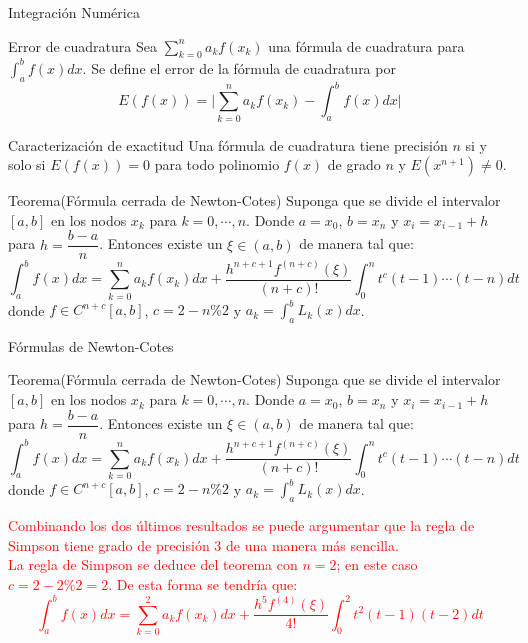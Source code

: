 \begin{frame}[allowframebreaks]{Integración Numérica}
\scriptsize
\begin{block}{Error de cuadratura}
Sea $\displaystyle \sum_{k=0}^{n}a_kf(x_k)$ una fórmula de cuadratura para $\displaystyle \int_{a}^{b}f(x)dx$. Se define el error de la fórmula de cuadratura por $$\displaystyle E(f(x))=\bigg|\sum_{k=0}^{n}a_kf(x_k)-\int_{a}^{b}f(x)dx\bigg|$$
\end{block}
\begin{block}{Caracterización de exactitud}
Una fórmula de cuadratura tiene precisión $n$ si y solo si $E(f(x))=0$ para todo polinomio $f(x)$ de grado $n$ y $E(x^{n+1})\neq 0$.
\end{block}
\begin{block}{Teorema(Fórmula cerrada de Newton-Cotes)}
Suponga que se divide el intervalor $[a,b]$ en los nodos $x_k$ para $k=0,\cdots, n$. Donde $a=x_0$, $b=x_n$ y $x_i=x_{i-1}+h$ para $h=\dfrac{b-a}{n}$. Entonces existe un $\xi\in(a,b)$ de manera tal que:
$$\int_a^b f(x)dx=\sum_{k=0}^{n}a_kf(x_k)dx+\dfrac{h^{n+c+1}f^{(n+c)}(\xi)}{(n+c)!}\int_{0}^{n}t^c(t-1)\cdots(t-n)dt$$
donde $f\in C^{n+c}[a,b]$, $c=2-n\%2$ y $\displaystyle a_k=\int_{a}^{b}L_k(x)dx$.
\end{block}
\end{frame}
\begin{frame}{Fórmulas de Newton-Cotes}
\small
\begin{block}{Teorema(Fórmula cerrada de Newton-Cotes)}
Suponga que se divide el intervalor $[a,b]$ en los nodos $x_k$ para $k=0,\cdots, n$. Donde $a=x_0$, $b=x_n$ y $x_i=x_{i-1}+h$ para $h=\dfrac{b-a}{n}$. Entonces existe un $\xi\in(a,b)$ de manera tal que:
$$\int_a^b f(x)dx=\sum_{k=0}^{n}a_kf(x_k)dx+\dfrac{h^{n+c+1}f^{(n+c)}(\xi)}{(n+c)!}\int_{0}^{n}t^c(t-1)\cdots(t-n)dt$$
donde $f\in C^{n+c}[a,b]$, $c=2-n\%2$ y $\displaystyle a_k=\int_{a}^{b}L_k(x)dx$.
\end{block}\pause
\textcolor{red}{\indent Combinando los dos últimos resultados se puede argumentar que la regla de Simpson tiene grado de precisión 3 de una manera más sencilla.\\\pause
\indent La regla de Simpson se deduce del teorema con $n=2$; en este caso $c=2-2\%2=2$. De esta forma se tendría que:\\\pause
$$\int_a^b f(x)dx=\sum_{k=0}^{2}a_kf(x_k)dx+\dfrac{h^{5}f^{(4)}(\xi)}{4!}\int_{0}^{2}t^2(t-1)(t-2)dt$$}\pause
\end{frame}

